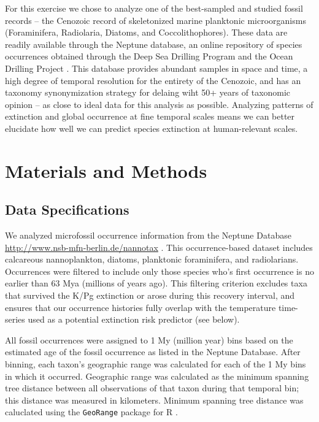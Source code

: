 \documentclass[12pt,letterpaper]{article}
\begin{document}
\begin{refsection}
For this exercise we chose to analyze one of the best-sampled and studied fossil records -- the Cenozoic record of skeletonized marine planktonic microorganisms (Foraminifera, Radiolaria, Diatoms, and Coccolithophores). These data are readily available through the Neptune database, an online repository of species occurrences obtained through the Deep Sea Drilling Program and the Ocean Drilling Project \citep{Lazarus1994,SpencerCervato1999}. This database provides abundant samples in space and time, a high degree of temporal resolution for the entirety of the Cenozoic, and has an taxonomy synonymization strategy for delaing wiht 50+ years of taxonomic opinion \citep{Lazarus1994} -- as close to ideal data for this analysis as possible. Analyzing patterns of extinction and global occurrence at fine temporal scales means we can better elucidate how well we can predict species extinction at human-relevant scales.



\section{Materials and Methods}

\subsection{Data Specifications}

We analyzed microfossil occurrence information from the Neptune Database \url{http://www.nsb-mfn-berlin.de/nannotax} \citep{Lazarus1994,SpencerCervato1999}. This occurrence-based dataset includes calcareous nannoplankton, diatoms, planktonic foraminifera, and radiolarians. Occurrences were filtered to include only those species who's first occurrence is no earlier than 63 Mya (millions of years ago). This filtering criterion excludes taxa that survived the K/Pg extinction or arose during this recovery interval, and ensures that our occurrence histories fully overlap with the temperature time-series used as a potential extinction risk predictor (see below). 

All fossil occurrences were assigned to 1 My (million year) bins based on the estimated age of the fossil occurrence as listed in the Neptune Database. After binning, each taxon's geographic range was calculated for each of the 1 My bins in which it occurred. Geographic range was calculated as the minimum spanning tree distance between all observations of that taxon during that temporal bin; this distance was measured in kilometers. Minimum spanning tree distance was caluclated using the \texttt{GeoRange} package for R \citep{GeoRange}. 


\end{refsection}
\end{document}
